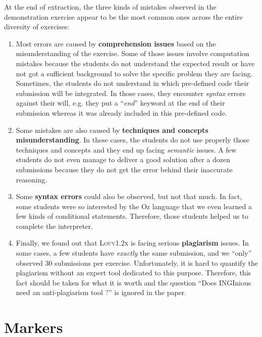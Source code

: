 \documentclass[11pt,a4paper,twoside,openright]{report}
\begin{document}
At the end of extraction, the three kinds of mistakes observed in the 
demonstration exercise appear to be the most common ones across the entire 
diversity of exercises:
\begin{enumerate}
 \item Most errors are caused by \textbf{comprehension issues} based on the 
misunderstanding of the exercise. Some of those issues involve computation 
mistakes because the students do not understand the expected result or have not 
got a sufficient background to solve the specific problem they are facing. 
Sometimes, the students do not understand in which pre-defined code their 
submission will be integrated. In those cases, they encounter \textit{syntax} 
errors against their will, e.g. they put a \enquote{\textit{end}} keyword at the end of 
their submission whereas it was already included in this pre-defined code.

 \item Some mistakes are also caused by \textbf{techniques and 
concepts misunderstanding}. In these cases, the students do not use properly 
those techniques and concepts and they end up facing \textit{semantic} 
issues. A few students do not even manage to deliver a good solution after a 
dozen submissions because they do not get the error behind their 
inaccurate reasoning.

 \item Some \textbf{syntax errors} could also be observed, but not that much. 
In fact, some students were so interested by the Oz language that we even 
learned a few kinds of conditional statements. Therefore, those students 
helped us to complete the interpreter.

 \item Finally, we found out that \textsc{Louv1.2x} is facing serious 
\textbf{plagiarism} issues. In some cases, a few students have \textit{exactly} 
the same submission, and we \enquote{only} observed 30 submissions per 
exercise. Unfortunately, it is hard to quantify the plagiarism without an 
expert tool dedicated to this purpose. Therefore, this fact should be taken for 
what it is worth and the question \enquote{Does INGInious need an anti-plagiarism 
tool ?} is ignored in the paper.
\end{enumerate}
 
\section{Markers} \label{sec:markers}
\end{document}
